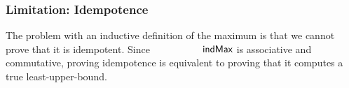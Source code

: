 \begin{code}
%
\>[12]\AgdaSymbol{\{}\AgdaSpace{}%
\AgdaSymbol{:}\AgdaSpace{}%
\AgdaSymbol{\}}\<%
\\
%
\>[12]\AgdaSymbol{(}\AgdaSpace{}%
\AgdaSymbol{:}\AgdaSpace{}%
%
\>[22]\AgdaSpace{}%
\AgdaSpace{}%
\AgdaSymbol{)}\<%
\\
%
\>[12]%
\>[15]\AgdaSpace{}%
\AgdaSymbol{(}%
\>[28]\AgdaSpace{}%
\AgdaSymbol{)}\AgdaSpace{}%
\AgdaSymbol{(}%
\>[41]\AgdaSpace{}%
\AgdaSymbol{)}\<%
\\
\>[12][@{}l@{\AgdaIndent{0}}]%
\>[14]\AgdaSpace{}%
%
\>[21]\AgdaSpace{}%
\AgdaSpace{}%
\AgdaSpace{}%
\AgdaSpace{}%
%
\>[37]\AgdaSpace{}%
\AgdaSpace{}%
\AgdaSpace{}%
\AgdaSpace{}%
\AgdaSpace{}%
\AgdaSymbol{(}\AgdaSpace{}%
\AgdaSymbol{)}\AgdaSpace{}%
\AgdaSymbol{(}\AgdaSpace{}%
\AgdaSymbol{)))}\<%
\\
%
\>[8]\AgdaSpace{}%
\AgdaSpace{}%
\AgdaSpace{}%
\AgdaSymbol{=}\AgdaSpace{}%
%
\>[37]\AgdaSymbol{\AgdaUnderscore{}}\AgdaSpace{}%
\AgdaSymbol{\AgdaUnderscore{}}\AgdaSpace{}%
\AgdaSpace{}%
\AgdaSpace{}%
\AgdaSpace{}%
%
\>[62]\AgdaSymbol{\AgdaUnderscore{}}\AgdaSpace{}%
\AgdaSymbol{(}\AgdaSpace{}%
\AgdaSymbol{))}\<%
\\
\>[0]\<%
\end{code}


\subsubsection{Limitation: Idempotence}

The problem with an inductive definition of the maximum
is that we cannot prove that it is idempotent. Since $\indMax$ is associative
and commutative, proving idempotence is equivalent to proving that it computes
a true least-upper-bound.

